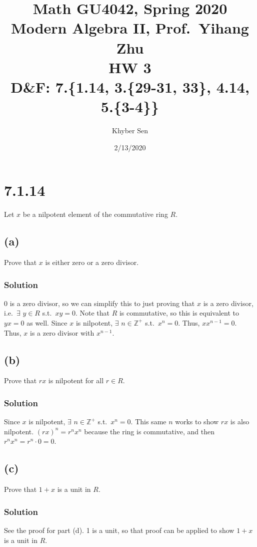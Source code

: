 \documentclass[fleqn]{article}
\title{
Math GU4042, Spring 2020 \\
Modern Algebra II, Prof.\ Yihang Zhu \\
HW 3 \\
D\&F: 7.\{1.14, 3.\{29-31, 33\}, 4.14, 5.\{3-4\}\}
}
\author{Khyber Sen}
\date{2/13/2020}
\begin{document}
    
    \maketitle
    
    \section{7.1.14}
    Let $x$ be a nilpotent element of the commutative ring $R$.
        
        \subsection{(a)}
        Prove that $x$ is either zero or a zero divisor.
            
            \subsubsection{Solution}
            0 is a zero divisor, so we can simplify this to just proving that $x$ is a zero divisor, i.e.\ $\exists$ $y \in R$ s.t.\ $xy = 0$.  Note that $R$ is commutative, so this is equivalent to $yx = 0$ as well.  Since $x$ is nilpotent, $\exists$ $n \in \mathbb{Z}^+$ s.t.\ $x^n = 0$.  Thus, $x x^{n - 1} = 0$.  Thus, $x$ is a zero divisor with $x^{n - 1}$.
        
        \subsection{(b)}
        Prove that $rx$ is nilpotent for all $r \in R$.
            
            \subsubsection{Solution}
            Since $x$ is nilpotent, $\exists$ $n \in \mathbb{Z}^+$ s.t.\ $x^n = 0$.  This same $n$ works to show $rx$ is also nilpotent.  $(rx)^n = r^n x^n$ because the ring is commutative, and then $r^n x^n = r^n \cdot 0 = 0$.
        
        \subsection{(c)}
        Prove that $1 + x$ is a unit in $R$.
            
            \subsubsection{Solution}
            See the proof for part (d).  1 is a unit, so that proof can be applied to show $1 + x$ is a unit in $R$.
        
\end{document}
